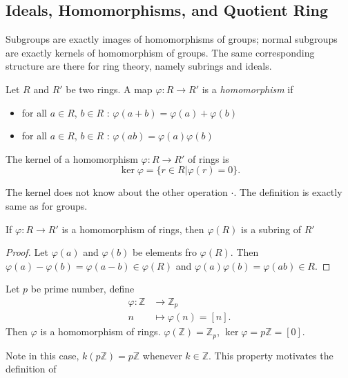 
\subsection{Ideals, Homomorphisms, and Quotient Ring}

\begin{remark}
	Subgroups are exactly images of homomorphisms of groups; normal subgroups are exactly kernels of homomorphism of groups. The same corresponding structure are there for ring theory, namely subrings and ideals.
\end{remark}

\begin{definition}[Homomorphism]
	Let $R$ and $R'$ be two rings. A map $\varphi: R \to R'$ is a \textit{homomorphism} if
	\begin{itemize}
		\item for all $a \in R$, $b \in R$ : $\varphi(a+b) = \varphi(a)+\varphi(b)$
		\item for all $a \in R$, $b \in R$ : $\varphi(ab) = \varphi(a)\varphi(b)$
	\end{itemize}
\end{definition}

\begin{definition}[kernel]
	The kernel of a homomorphism $\varphi: R \to  R'$ of rings is \[
		\operatorname{ker} \varphi = \{r \in R | \varphi(r) = 0\} 
	.\] 
\end{definition}
\begin{remark}
	The kernel does not know about the other operation $\cdot$. The definition is exactly same as for groups.
\end{remark}
\begin{observation}
	If $\varphi: R \to R'$ is a homomorphism of rings, then $\varphi(R)$ is a subring of $R'$
\begin{proof}
	Let $\varphi(a)$ and $\varphi(b)$ be elements fro $\varphi(R)$. Then $\varphi(a) - \varphi(b) = \varphi(a-b) \in \varphi(R)$ and $\varphi(a) \varphi(b) = \varphi(ab) \in R$.
\end{proof}
\end{observation}

\begin{example}
	Let $p$ be prime number, define
	\begin{align*}
		\varphi: \mathbb{Z} &\longrightarrow \mathbb{Z}_p \\
		n &\longmapsto \varphi(n) = [n]
	.\end{align*}
	Then $\varphi$ is a homomorphism of rings.
	$\varphi(\mathbb{Z}) = \mathbb{Z}_p$, $\operatorname{ker} \varphi = p\mathbb{Z} = [0]$.

	Note in this case, $k (p\mathbb{Z}) = p\mathbb{Z}$ whenever $k \in \mathbb{Z}$. This property motivates the definition of
\end{example}


